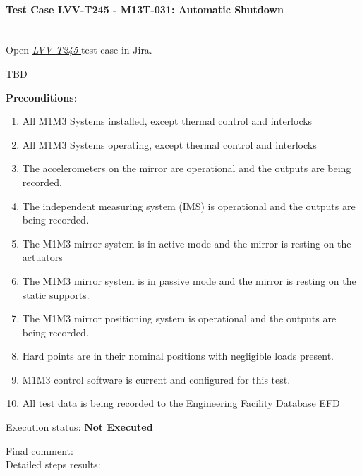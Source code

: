 \documentclass[SE,lsstdraft,STR,toc]{lsstdoc}
\providecommand{\tightlist}{
  \setlength{\itemsep}{0pt}\setlength{\parskip}{0pt}}
\begin{document}
\paragraph{Test Case LVV-T245 - M13T-031: Automatic Shutdown }\mbox{}\\

Open  \href{https://jira.lsstcorp.org/secure/Tests.jspa#/testCase/LVV-T245}{\textit{ LVV-T245 } }
test case in Jira.

TBD

\textbf{ Preconditions}:\\
\begin{enumerate}
\tightlist
\item
  All M1M3 Systems installed, except thermal control and interlocks
\item
  All M1M3 Systems operating, except thermal control and interlocks
\item
  The accelerometers on the mirror are operational and the outputs are
  being recorded.
\item
  The independent measuring system (IMS) is operational and the outputs
  are being recorded.
\item
  The M1M3 mirror system is in active mode and the mirror is resting on
  the actuators
\item
  The M1M3 mirror system is in passive mode and the mirror is resting on
  the static supports.
\item
  The M1M3 mirror positioning system is operational and the outputs are
  being recorded.
\item
  Hard points are in their nominal positions with negligible loads
  present.
\item
  M1M3 control software is current and configured for this test.
\item
  All test data is being recorded to the Engineering Facility Database
  EFD
\end{enumerate}

Execution status: {\bf Not Executed }

Final comment:\\


Detailed steps results:
\end{document}
